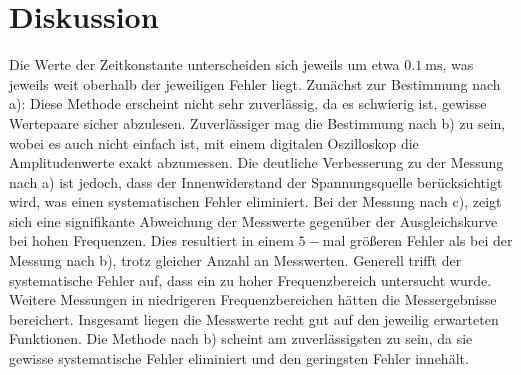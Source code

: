 \section{Diskussion}
\label{sec:Diskussion}
Die Werte der Zeitkonstante unterscheiden sich jeweils um etwa $\SI{0.1}{\milli\second}$, was jeweils weit oberhalb der jeweiligen Fehler liegt.
Zunächst zur Bestimmung nach a):
Diese Methode erscheint nicht sehr zuverlässig, da es schwierig ist, gewisse Wertepaare sicher abzulesen.
Zuverlässiger mag die Bestimmung nach b) zu sein, wobei es auch nicht einfach ist, mit einem digitalen Oszilloskop die Amplitudenwerte exakt abzumessen.
Die deutliche Verbesserung zu der Messung nach a) ist jedoch, dass der Innenwiderstand der Spannungsquelle berücksichtigt wird, was einen systematischen Fehler eliminiert.
Bei der Messung nach c), zeigt sich eine signifikante Abweichung der Messwerte gegenüber der Ausgleichskurve bei hohen Frequenzen.
Dies resultiert in einem $5-$mal größeren Fehler als bei der Messung nach b), trotz gleicher Anzahl an Messwerten.
Generell trifft der systematische Fehler auf, dass ein zu hoher Frequenzbereich untersucht wurde.
Weitere Messungen in niedrigeren Frequenzbereichen hätten die Messergebnisse bereichert.
Insgesamt liegen die Messwerte recht gut auf den jeweilig erwarteten Funktionen.
Die Methode nach b) scheint am zuverlässigsten zu sein, da sie gewisse systematische Fehler eliminiert und den geringsten Fehler innehält.
